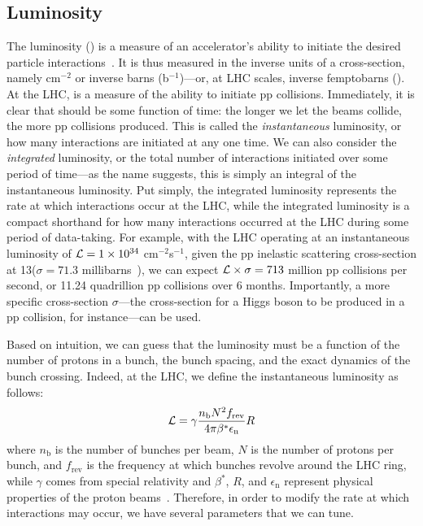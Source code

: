 \subsection{Luminosity}
The luminosity (\Lumi) is a measure of an accelerator's ability to initiate the desired particle interactions~\cite{Herr:941318}. 
It is thus measured in the inverse units of a cross-section, namely cm$^{-2}$ or inverse barns (b$^{-1}$)---or, at LHC scales, inverse femptobarns (\fbinv).
At the LHC, \Lumi is a measure of the ability to initiate pp collisions. 
Immediately, it is clear that \Lumi should be some function of time: the longer we let the beams collide, the more pp collisions produced. 
This is called the \textit{instantaneous} luminosity, or how many interactions are initiated at any one time. 
We can also consider the \textit{integrated} luminosity, or the total number of interactions initiated over some period of time---as the name suggests, this is simply an integral of the instantaneous luminosity. 
Put simply, the integrated luminosity represents the rate at which interactions occur at the LHC, while the integrated luminosity is a compact shorthand for how many interactions occurred at the LHC during some period of data-taking. 
For example, with the LHC operating at an instantaneous luminosity of $\mathcal{L} = 1\times10^{34}$ cm$^{-2}$s$^{-1}$, given the pp inelastic scattering cross-section at 13\TeV ($\sigma = 71.3$ millibarns~\cite{CMS-PAS-FSQ-15-005}), we can expect $\mathcal{L}\times\sigma = 713$ million pp collisions per second, or 11.24 quadrillion pp collisions over 6 months. 
Importantly, a more specific cross-section $\sigma$---the cross-section for a Higgs boson to be produced in a pp collision, for instance---can be used. 

Based on intuition, we can guess that the luminosity must be a function of the number of protons in a bunch, the bunch spacing, and the exact dynamics of the bunch crossing. 
Indeed, at the LHC, we define the instantaneous luminosity as follows:
\begin{equation}
    \mathcal{L} = \gamma\frac{n_\mathrm{b}N^2f_\text{rev}}{4\pi\beta^{*}\epsilon_\mathrm{n}}R
\end{equation}
where $n_\mathrm{b}$ is the number of bunches per beam, $N$ is the number of protons per bunch, and $f_\text{rev}$ is the frequency at which bunches revolve around the LHC ring, while $\gamma$ comes from special relativity and $\beta^{*}$, $R$, and $\epsilon_\mathrm{n}$ represent physical properties of the proton beams~\cite{Aberle:2749422}. 
Therefore, in order to modify the rate at which interactions may occur, we have several parameters that we can tune.

